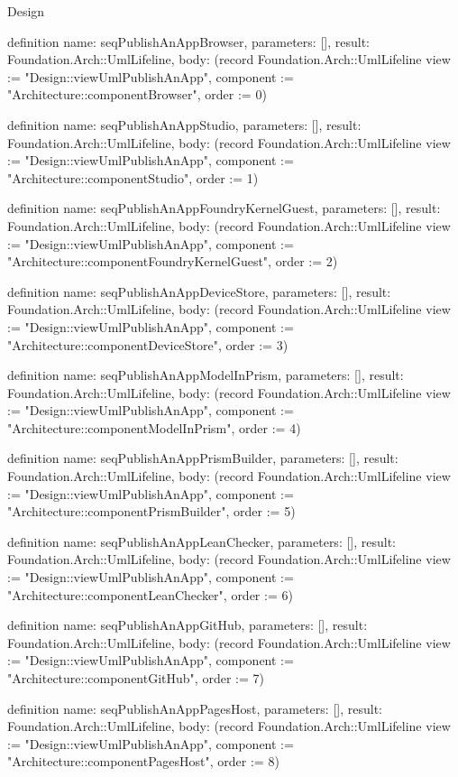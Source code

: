 \begin{lexlean}{Design}
\begin{semanticmodule}
definition{
  name: seqPublishAnAppBrowser,
  parameters: [],
  result: Foundation.Arch::UmlLifeline,
  body: (record Foundation.Arch::UmlLifeline {view := "Design::viewUmlPublishAnApp", component := "Architecture::componentBrowser", order := 0})
}

definition{
  name: seqPublishAnAppStudio,
  parameters: [],
  result: Foundation.Arch::UmlLifeline,
  body: (record Foundation.Arch::UmlLifeline {view := "Design::viewUmlPublishAnApp", component := "Architecture::componentStudio", order := 1})
}

definition{
  name: seqPublishAnAppFoundryKernelGuest,
  parameters: [],
  result: Foundation.Arch::UmlLifeline,
  body: (record Foundation.Arch::UmlLifeline {view := "Design::viewUmlPublishAnApp", component := "Architecture::componentFoundryKernelGuest", order := 2})
}

definition{
  name: seqPublishAnAppDeviceStore,
  parameters: [],
  result: Foundation.Arch::UmlLifeline,
  body: (record Foundation.Arch::UmlLifeline {view := "Design::viewUmlPublishAnApp", component := "Architecture::componentDeviceStore", order := 3})
}

definition{
  name: seqPublishAnAppModelInPrism,
  parameters: [],
  result: Foundation.Arch::UmlLifeline,
  body: (record Foundation.Arch::UmlLifeline {view := "Design::viewUmlPublishAnApp", component := "Architecture::componentModelInPrism", order := 4})
}

definition{
  name: seqPublishAnAppPrismBuilder,
  parameters: [],
  result: Foundation.Arch::UmlLifeline,
  body: (record Foundation.Arch::UmlLifeline {view := "Design::viewUmlPublishAnApp", component := "Architecture::componentPrismBuilder", order := 5})
}

definition{
  name: seqPublishAnAppLeanChecker,
  parameters: [],
  result: Foundation.Arch::UmlLifeline,
  body: (record Foundation.Arch::UmlLifeline {view := "Design::viewUmlPublishAnApp", component := "Architecture::componentLeanChecker", order := 6})
}

definition{
  name: seqPublishAnAppGitHub,
  parameters: [],
  result: Foundation.Arch::UmlLifeline,
  body: (record Foundation.Arch::UmlLifeline {view := "Design::viewUmlPublishAnApp", component := "Architecture::componentGitHub", order := 7})
}

definition{
  name: seqPublishAnAppPagesHost,
  parameters: [],
  result: Foundation.Arch::UmlLifeline,
  body: (record Foundation.Arch::UmlLifeline {view := "Design::viewUmlPublishAnApp", component := "Architecture::componentPagesHost", order := 8})
}


\end{semanticmodule}
\end{lexlean}
